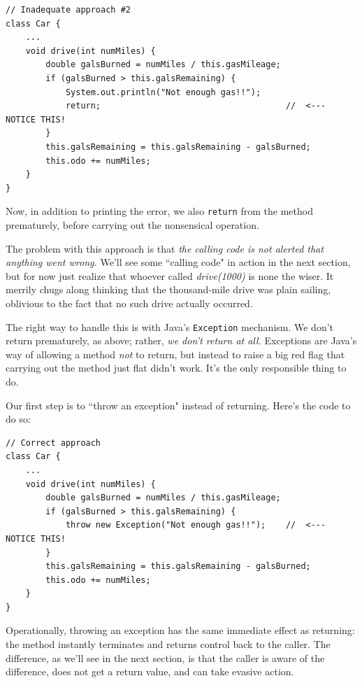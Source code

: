 \begin{Verbatim}[samepage=true,fontsize=\footnotesize,frame=single]
// Inadequate approach #2
class Car {
    ...
    void drive(int numMiles) {
        double galsBurned = numMiles / this.gasMileage;
        if (galsBurned > this.galsRemaining) {
            System.out.println("Not enough gas!!");
            return;                                     //  <---  NOTICE THIS!
        }
        this.galsRemaining = this.galsRemaining - galsBurned;
        this.odo += numMiles;
    }
}
\end{Verbatim}

Now, in addition to printing the error, we also \texttt{return} from the
method prematurely, before carrying out the nonsensical operation.

The problem with this approach is that \textit{the calling code is not alerted
that anything went wrong.} We'll see some ``calling code" in action in the
next section, but for now just realize that whoever called
\textit{drive(1000)} is none the wiser. It merrily chugs along thinking that
the thousand-mile drive was plain sailing, oblivious to the fact that no such
drive actually occurred.

The right way to handle this is with Java's \texttt{Exception} mechanism. We
don't return prematurely, as above; rather, \textit{we don't return at all.}
Exceptions are Java's way of allowing a method \textit{not} to return, but
instead to raise a big red flag that carrying out the method just flat didn't
work. It's the only responsible thing to do.

Our first step is to ``throw an exception" instead of returning. Here's the
code to do so:

\begin{Verbatim}[samepage=true,fontsize=\footnotesize,frame=single]
// Correct approach
class Car {
    ...
    void drive(int numMiles) {
        double galsBurned = numMiles / this.gasMileage;
        if (galsBurned > this.galsRemaining) {
            throw new Exception("Not enough gas!!");    //  <---  NOTICE THIS!
        }
        this.galsRemaining = this.galsRemaining - galsBurned;
        this.odo += numMiles;
    }
}
\end{Verbatim}

Operationally, throwing an exception has the same immediate effect as
returning: the method instantly terminates and returns control back to the
caller. The difference, as we'll see in the next section, is that the caller
is aware of the difference, does not get a return value, and can take evasive
action.

